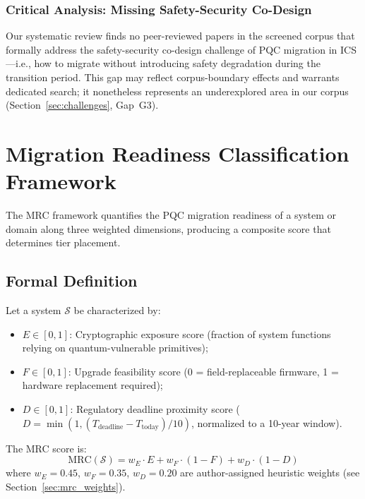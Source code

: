 \documentclass[journal]{IEEEtran}
\begin{document}
\subsubsection{Critical Analysis: Missing Safety-Security Co-Design}

Our systematic review finds no peer-reviewed papers in the screened corpus that
formally address the safety-security co-design challenge of PQC migration in
ICS---i.e., how to migrate without introducing safety degradation during the
transition period. This gap may reflect corpus-boundary effects and warrants
dedicated search; it nonetheless represents an underexplored area in our corpus
(Section~\ref{sec:challenges}, Gap~G3).

\section{Migration Readiness Classification Framework}
\label{sec:mrc}

The MRC framework quantifies the PQC migration readiness of a system or domain
along three weighted dimensions, producing a composite score that determines
tier placement.

\subsection{Formal Definition}

\begin{definition}
Let a system $\mathcal{S}$ be characterized by:
\begin{itemize}
  \item $E \in [0,1]$: Cryptographic exposure score (fraction of system
  functions relying on quantum-vulnerable primitives);
  \item $F \in [0,1]$: Upgrade feasibility score (0 = field-replaceable
  firmware, 1 = hardware replacement required);
  \item $D \in [0,1]$: Regulatory deadline proximity score ($D = \min(1, (T_{\text{deadline}} - T_{\text{today}}) / 10)$,
  normalized to a 10-year window).
\end{itemize}
The MRC score is:
\begin{equation}
  \text{MRC}(\mathcal{S}) = w_E \cdot E + w_F \cdot (1 - F) + w_D \cdot (1 - D)
  \label{eq:mrc}
\end{equation}
where $w_E = 0.45$, $w_F = 0.35$, $w_D = 0.20$ are author-assigned
heuristic weights (see Section~\ref{sec:mrc_weights}).
\end{definition}
\end{document}
